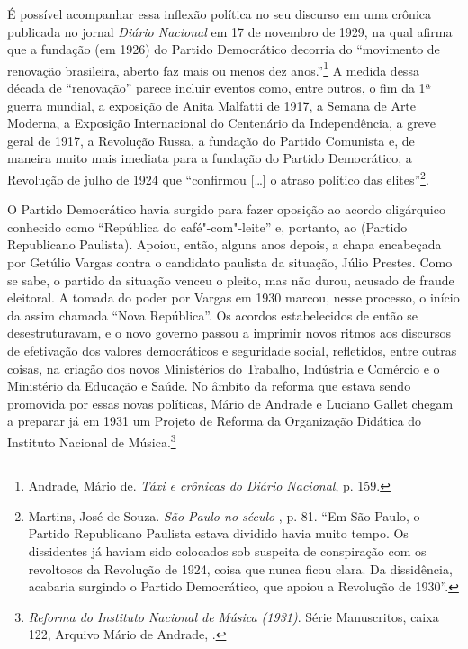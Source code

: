 É possível acompanhar essa inflexão política no seu discurso em uma
crônica publicada no jornal \emph{Diário Nacional} em 17 de novembro de
1929, na qual afirma que a fundação (em 1926) do Partido Democrático
decorria do ``movimento de renovação brasileira, aberto faz mais ou
menos dez anos.''\footnote{Andrade, Mário de. \emph{Táxi e crônicas do
  Diário Nacional}, p. 159.} A medida dessa década de ``renovação''
parece incluir eventos como, entre outros, o fim da 1ª guerra mundial, a
exposição de Anita Malfatti de 1917, a Semana de Arte Moderna, a
Exposição Internacional do Centenário da Independência, a greve geral de
1917, a Revolução Russa, a fundação do Partido Comunista e, de maneira
muito mais imediata para a fundação do Partido Democrático, a Revolução
de julho de 1924 que ``confirmou {[}\ldots{}{]} o atraso político das
elites''\footnote{Martins, José de Souza. \emph{São Paulo no século },
  p. 81. ``Em São Paulo, o Partido Republicano Paulista estava dividido
  havia muito tempo. Os dissidentes já haviam sido colocados sob
  suspeita de conspiração com os revoltosos da Revolução de 1924, coisa
  que nunca ficou clara. Da dissidência, acabaria surgindo o Partido
  Democrático, que apoiou a Revolução de 1930''.}.

O Partido Democrático havia surgido para fazer oposição ao acordo
oligárquico conhecido como ``República do café"-com"-leite'' e, portanto,
ao  (Partido Republicano Paulista). Apoiou, então, alguns anos
depois, a chapa encabeçada por Getúlio Vargas contra o candidato
paulista da situação, Júlio Prestes. Como se sabe, o partido da situação
venceu o pleito, mas não durou, acusado de fraude eleitoral. A tomada do
poder por Vargas em 1930 marcou, nesse processo, o início da assim
chamada ``Nova República''. Os acordos estabelecidos de então se
desestruturavam, e o novo governo passou a imprimir novos ritmos aos
discursos de efetivação dos valores democráticos e seguridade social,
refletidos, entre outras coisas, na criação dos novos Ministérios do
Trabalho, Indústria e Comércio e o Ministério da Educação e Saúde. No
âmbito da reforma que estava sendo promovida por essas novas políticas,
Mário de Andrade e Luciano Gallet chegam a preparar já em 1931 um
Projeto de Reforma da Organização Didática do Instituto Nacional de
Música.\footnote{\emph{Reforma do Instituto Nacional de Música (1931)}.
  Série Manuscritos, caixa 122, Arquivo Mário de Andrade, .}


